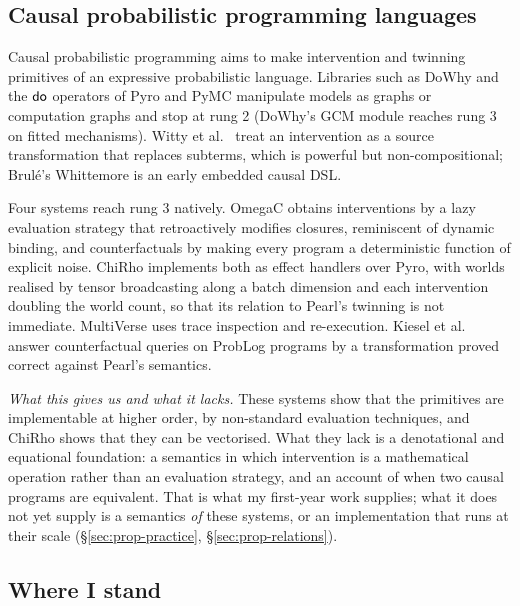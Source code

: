 \subsection{Causal probabilistic programming languages}

Causal probabilistic programming aims to make intervention and twinning primitives of an expressive probabilistic language. Libraries such as DoWhy \cite{pywhy,blobaum2024dowhygcm} and the $\mathsf{do}$ operators of Pyro and PyMC \cite{bingham2018pyro,abrilpla2023pymc} manipulate models as graphs or computation graphs and stop at rung 2 (DoWhy's GCM module reaches rung 3 on fitted mechanisms). Witty et al.\ \cite{witty2019synthesis,witty2023bayesian} treat an intervention as a source transformation that replaces subterms, which is powerful but non-compositional; Brulé's Whittemore \cite{brule2018whittemore} is an early embedded causal DSL.

Four systems reach rung 3 natively. OmegaC \cite{tavares2021language} obtains interventions by a lazy evaluation strategy that retroactively modifies closures, reminiscent of dynamic binding, and counterfactuals by making every program a deterministic function of explicit noise. ChiRho \cite{chirho} implements both as effect handlers over Pyro, with worlds realised by tensor broadcasting along a batch dimension and each intervention doubling the world count, so that its relation to Pearl's twinning is not immediate. MultiVerse \cite{perov2020multiverse} uses trace inspection and re-execution. Kiesel et al.\ \cite{kiesel2023whatif} answer counterfactual queries on ProbLog programs by a transformation proved correct against Pearl's semantics.

\emph{What this gives us and what it lacks.} These systems show that the primitives are implementable at higher order, by non-standard evaluation techniques, and ChiRho shows that they can be vectorised. What they lack is a denotational and equational foundation: a semantics in which intervention is a mathematical operation rather than an evaluation strategy, and an account of when two causal programs are equivalent. That is what my first-year work supplies; what it does not yet supply is a semantics \emph{of} these systems, or an implementation that runs at their scale (\S\ref{sec:prop-practice}, \S\ref{sec:prop-relations}).

\subsection{Where I stand}\label{sec:intv-wherewestand}

